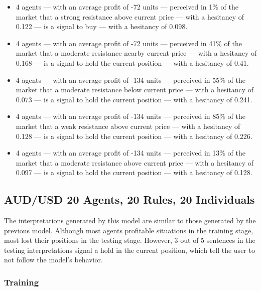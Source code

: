 {\small
  \begin{itemize}
  \item 4 agents — with an average profit of -72 units — perceived in 1\% of the
    market that a strong resistance above current price — with a hesitancy of
    0.122 — is a signal to buy — with a hesitancy of 0.098.
  \item 4 agents — with an average profit of -72 units — perceived in 41\% of
    the market that a moderate resistance nearby current price — with a
    hesitancy of 0.168 — is a signal to hold the current position — with a
    hesitancy of 0.41.
  \item 4 agents — with an average profit of -134 units — perceived in 55\% of
    the market that a moderate resistance below current price — with a hesitancy
    of 0.073 — is a signal to hold the current position — with a hesitancy of
    0.241.
  \item 4 agents — with an average profit of -134 units — perceived in 85\% of
    the market that a weak resistance above current price — with a hesitancy of
    0.128 — is a signal to hold the current position — with a hesitancy of
    0.226.
  \item 4 agents — with an average profit of -134 units — perceived in 13\% of
    the market that a moderate resistance above current price — with a hesitancy
    of 0.097 — is a signal to hold the current position — with a hesitancy of
    0.128.
  \end{itemize}
}

\subsection{AUD/USD 20 Agents, 20 Rules, 20 Individuals}
\label{}

The interpretations generated by this model are similar to those generated by the previous model. Although most agents profitable situations in the training stage, most lost their positions in the testing stage. However, 3 out of 5 sentences in the testing interpretations signal a hold in the current position, which tell the user to not follow the model's behavior.

\subsubsection{Training}
\label{}

